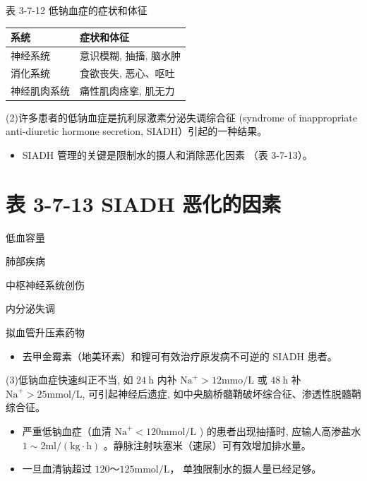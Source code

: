 \documentclass[10pt]{article}
\begin{document}
表 3-7-12 低钠血症的症状和体征

\begin{center}
\begin{tabular}{ll}
\hline
系统 & 症状和体征 \\
\hline
神经系统 & 意识模糊, 抽搐, 脑水肿 \\
消化系统 & 食欲丧失, 恶心、呕吐 \\
神经肌肉系统 & 痛性肌肉痉挛, 肌无力 \\
\hline
\end{tabular}
\end{center}

(2)许多患者的低钠血症是抗利尿激素分泌失调综合征 (syndrome of inappropriate anti-diuretic hormone secretion, SIADH）引起的一种结果。

\begin{itemize}
  \item SIADH 管理的关键是限制水的摄人和消除恶化因素 （表 3-7-13）。
\end{itemize}

\section*{表 3-7-13 SIADH 恶化的因素}
低血容量

肺部疾病

中枢神经系统创伤

内分泌失调

拟血管升压素药物

\begin{itemize}
  \item 去甲金霉素（地美环素）和锂可有效治疗原发病不可逆的 SIADH 患者。
\end{itemize}

(3)低钠血症快速纠正不当, 如 $24 \mathrm{~h}$ 内补 $\mathrm{Na}^{+}>12 \mathrm{mmo} / \mathrm{L}$ 或 $48 \mathrm{~h}$ 补 $\mathrm{Na}^{+}>25 \mathrm{mmol} / \mathrm{L}$, 可引起神经后遗症, 如中央脑桥髓鞘破坏综合征、渗透性脱髓鞘综合征。

\begin{itemize}
  \item 严重低钠血症（血清 $\mathrm{Na}^{+}<120 \mathrm{mmol} / \mathrm{L}$ ) 的患者出现抽搐时, 应输人高渗盐水 $1 \sim 2 \mathrm{ml} /(\mathrm{kg} \cdot \mathrm{h})$ 。静脉注射呋塞米（速尿）可有效增加排水量。
  \item 一旦血清钠超过 $120 ～ 125 \mathrm{mmol} / \mathrm{L} ，$ 单独限制水的摄人量已经足够。
\end{itemize}
\end{document}
